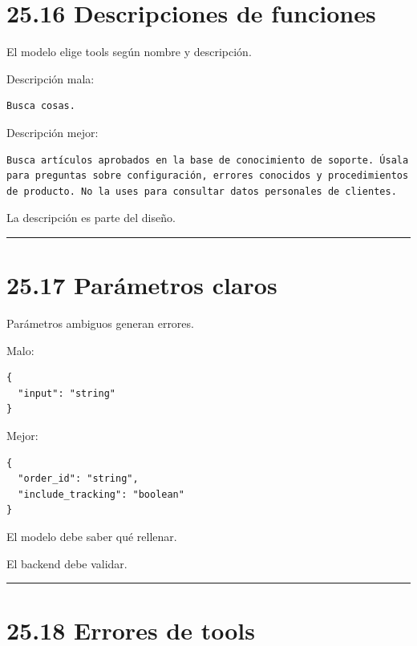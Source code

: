 \section{25.16 Descripciones de
funciones}\label{descripciones-de-funciones}

El modelo elige tools según nombre y descripción.

Descripción mala:

\begin{lstlisting}
Busca cosas.
\end{lstlisting}

Descripción mejor:

\begin{lstlisting}
Busca artículos aprobados en la base de conocimiento de soporte. Úsala para preguntas sobre configuración, errores conocidos y procedimientos de producto. No la uses para consultar datos personales de clientes.
\end{lstlisting}

La descripción es parte del diseño.

\begin{center}\rule{0.5\linewidth}{0.5pt}\end{center}

\section{25.17 Parámetros claros}\label{paruxe1metros-claros}

Parámetros ambiguos generan errores.

Malo:

\begin{lstlisting}
{
  "input": "string"
}
\end{lstlisting}

Mejor:

\begin{lstlisting}
{
  "order_id": "string",
  "include_tracking": "boolean"
}
\end{lstlisting}

El modelo debe saber qué rellenar.

El backend debe validar.

\begin{center}\rule{0.5\linewidth}{0.5pt}\end{center}

\section{25.18 Errores de tools}\label{errores-de-tools}

